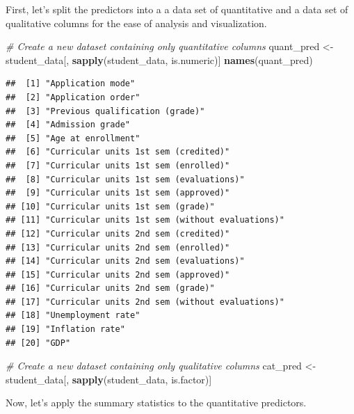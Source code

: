 \documentclass[
]{article}
\newenvironment{Shaded}{\begin{snugshade}}{\end{snugshade}}
\newcommand{\CommentTok}[1]{\textcolor[rgb]{0.56,0.35,0.01}{\textit{#1}}}
\newcommand{\FunctionTok}[1]{\textcolor[rgb]{0.13,0.29,0.53}{\textbf{#1}}}
\newcommand{\NormalTok}[1]{#1}
\newcommand{\OtherTok}[1]{\textcolor[rgb]{0.56,0.35,0.01}{#1}}
\begin{document}
First, let's split the predictors into a a data set of quantitative and
a data set of qualitative columns for the ease of analysis and
visualization.

\begin{Shaded}
\begin{Highlighting}[]
\CommentTok{\# Create a new dataset containing only quantitative columns}
\NormalTok{quant\_pred }\OtherTok{\textless{}{-}}\NormalTok{ student\_data[, }\FunctionTok{sapply}\NormalTok{(student\_data, is.numeric)]}
\FunctionTok{names}\NormalTok{(quant\_pred)}
\end{Highlighting}
\end{Shaded}

\begin{verbatim}
##  [1] "Application mode"                              
##  [2] "Application order"                             
##  [3] "Previous qualification (grade)"                
##  [4] "Admission grade"                               
##  [5] "Age at enrollment"                             
##  [6] "Curricular units 1st sem (credited)"           
##  [7] "Curricular units 1st sem (enrolled)"           
##  [8] "Curricular units 1st sem (evaluations)"        
##  [9] "Curricular units 1st sem (approved)"           
## [10] "Curricular units 1st sem (grade)"              
## [11] "Curricular units 1st sem (without evaluations)"
## [12] "Curricular units 2nd sem (credited)"           
## [13] "Curricular units 2nd sem (enrolled)"           
## [14] "Curricular units 2nd sem (evaluations)"        
## [15] "Curricular units 2nd sem (approved)"           
## [16] "Curricular units 2nd sem (grade)"              
## [17] "Curricular units 2nd sem (without evaluations)"
## [18] "Unemployment rate"                             
## [19] "Inflation rate"                                
## [20] "GDP"
\end{verbatim}

\begin{Shaded}
\begin{Highlighting}[]
\CommentTok{\# Create a new dataset containing only qualitative columns}
\NormalTok{cat\_pred }\OtherTok{\textless{}{-}}\NormalTok{ student\_data[, }\FunctionTok{sapply}\NormalTok{(student\_data, is.factor)]}
\end{Highlighting}
\end{Shaded}

Now, let's apply the summary statistics to the quantitative predictors.
\end{document}
